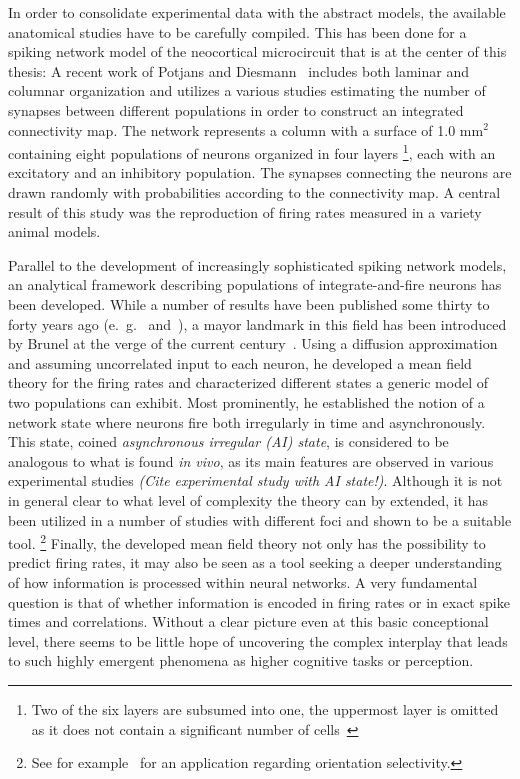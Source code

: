 In order to consolidate experimental data with the abstract models,
the available anatomical studies have to be carefully compiled.
This has been done for a spiking network model of the neocortical microcircuit
that is at the center of this thesis:
A recent work of Potjans and Diesmann~\cite{potjans2014} 
includes both laminar and columnar organization and utilizes a various studies 
estimating the number of synapses between different populations in order to construct an
integrated connectivity map.
The network represents a column with a
surface of 1.0 $\text{mm}^2$ containing eight populations of neurons organized in four layers%
\footnote{
    Two of the six layers are subsumed into one, the uppermost layer is omitted as it
does not contain a significant number of cells~\cite{potjans2014}
}, each with an excitatory and an inhibitory population. 
The synapses connecting the neurons are drawn randomly with probabilities according to 
the connectivity map. A central result of this study was the reproduction of 
firing rates measured in a variety animal models. 

Parallel to the development of increasingly sophisticated spiking network models, 
an analytical framework describing populations of integrate-and-fire neurons has 
been developed. While a number of results have been published some thirty to forty years ago
(e.~g.~\cite{ricciardi2013diffusion} and~\cite{tuckwell2005introduction}), a mayor landmark
in this field has been introduced by Brunel at the verge of the current century~\cite{brunel2000}. 
Using a diffusion approximation and assuming uncorrelated input to each neuron, he
developed a mean field theory for the firing rates and characterized different states
a generic model of two populations can exhibit. Most prominently, he established the 
notion of a network state where neurons fire both irregularly in time and asynchronously. 
This state, coined \textit{asynchronous irregular (AI) state}, is considered to be 
analogous to what is found \textit{in vivo}, as its main features are observed in various 
experimental studies
\emph{(Cite experimental study with AI state!)}.
Although it is not in general clear to what level of complexity the theory can by extended, 
it has been utilized in a number of studies with different 
foci and shown to be a suitable tool.%
\footnote{
    See for example~\cite{sadeh2015orientation} for an application 
    regarding orientation selectivity.
} Finally, the developed mean field theory not only has the possibility to predict 
firing rates, it may also be seen as a tool seeking a deeper understanding of 
how information is processed within neural networks. A very fundamental
question is that of whether information is encoded in firing rates 
or in exact spike times and correlations. Without a clear picture even at this basic
conceptional level, there seems to be little hope of uncovering the 
complex interplay that leads to such highly emergent phenomena as higher cognitive tasks 
or perception. 

